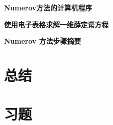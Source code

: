     \noindent\textbf{Numerov方法的计算机程序}

    \noindent\textbf{使用电子表格求解一维薛定谔方程}

    \noindent\textbf{Numerov 方法步骤摘要}






    



\section*{总结}

\section*{习题}
